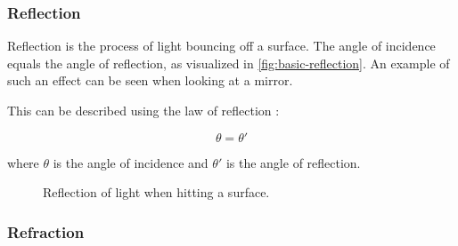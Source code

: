 \subsubsection{Reflection}

Reflection is the process of light bouncing off a surface. The angle of incidence equals the angle of reflection, as visualized in \autoref{fig:basic-reflection}. An example of such an effect can be seen when looking at a mirror.


This can be described using the law of reflection \cite{fowles1989introduction}:

\begin{equation}
  \label{eqn:law-of-reflection}
  \theta = \theta'
\end{equation}

where $\theta$ is the angle of incidence and $\theta'$ is the angle of reflection.

\begin{figure}[H]
  \centering
  \caption{Reflection of light when hitting a surface.}
  \label{fig:basic-reflection}
\end{figure}

\subsubsection{Refraction}


